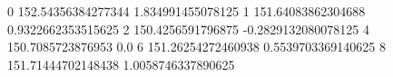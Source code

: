 0 152.54356384277344 1.834991455078125
1 151.64083862304688 0.9322662353515625
2 150.4256591796875 -0.2829132080078125
4 150.7085723876953 0.0
6 151.26254272460938 0.5539703369140625
8 151.71444702148438 1.0058746337890625
